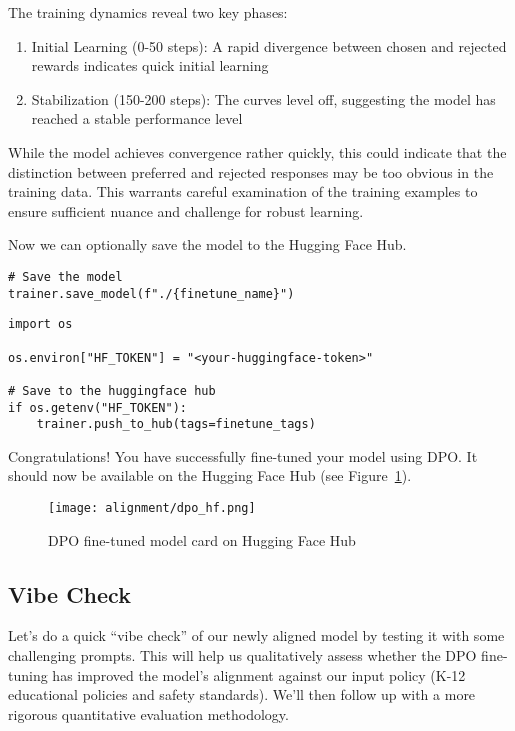 The training dynamics reveal two key phases:

\begin{enumerate}
\item Initial Learning (0-50 steps): A rapid divergence between chosen and rejected rewards indicates quick initial learning
\item Stabilization (150-200 steps): The curves level off, suggesting the model has reached a stable performance level
\end{enumerate}

While the model achieves convergence rather quickly, this could indicate that the distinction between preferred and rejected responses may be too obvious in the training data. This warrants careful examination of the training examples to ensure sufficient nuance and challenge for robust learning.

Now we can optionally save the model to the Hugging Face Hub.

\begin{verbatim}
# Save the model
trainer.save_model(f"./{finetune_name}")
\end{verbatim}

\begin{verbatim}
import os

os.environ["HF_TOKEN"] = "<your-huggingface-token>"

# Save to the huggingface hub
if os.getenv("HF_TOKEN"):
    trainer.push_to_hub(tags=finetune_tags)
\end{verbatim}

Congratulations! You have successfully fine-tuned your model using DPO. It should now be available on the Hugging Face Hub (see Figure~\ref{fig:dpo-hf}).

\begin{figure}[H]
\centering
\texttt{[image: alignment/dpo\_hf.png]}
\caption{DPO fine-tuned model card on Hugging Face Hub}
\label{fig:dpo-hf}
\end{figure}


\subsection{Vibe Check}

Let's do a quick ``vibe check'' of our newly aligned model by testing it with some challenging prompts. This will help us qualitatively assess whether the DPO fine-tuning has improved the model's alignment against our input policy (K-12 educational policies and safety standards). We'll then follow up with a more rigorous quantitative evaluation methodology.

